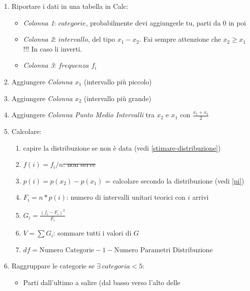 \begin{enumerate}
      \item Riportare i dati in una tabella in Calc:
            \begin{itemize}
                  \item \textit{Colonna 1}: $categorie$, probabilmente devi
                        aggiungerle tu, parti da 0 in poi
                  \item \textit{Colonna 2}: $intervallo$, del tipo $x_1 - x_2$.
                        Fai sempre attenzione che $x_2 \ge x_1$ !!! In caso li
                        inverti.
                  \item  \textit{Colonna 3}: $frequenza$ $f_i$
            \end{itemize}
      \item Aggiungere \textit{Colonna $x_1$} (intervallo più piccolo)
      \item Aggiungere \textit{Colonna $x_2$} (intervallo più grande)
      \item Aggiungere \textit{Colonna Punto Medio Intervalli} tra \textit{$x_2$} e
            \textit{$x_1$} con $\frac{x_1 + x_2}{2}$
      \item Calcolare:
            \begin{enumerate}
                  \item capire la distribuzione se non è data (vedi
                        \ref{stimare-distribuzione})
                  \item \st{$f(i) = f_i / n$: non serve}
                  \item $p(i) = p(x_2) - p(x_1)$ = calcolare secondo la distribuzione (vedi \ref{pi})
                  \item $F_i = n * p(i)$: numero di intervalli unitari teorici
                        con $i$ arrivi
                  \item $G_i = \frac{(f_i - F_i)^2}{F_i}$
                  \item $V = \sum G_i$: sommare tutti i valori di $G$
                  \item $df = \text{Numero Categorie} - 1 - \text{Numero
                                    Parametri Distribuzione}$
            \end{enumerate}
      \item Raggruppare le categorie se $\exists \ categoria < 5$:
            \begin{itemize}
                  \item Parti dall'ultimo a salire (dal basso verso l'alto delle

\end{itemize}
\end{enumerate}

